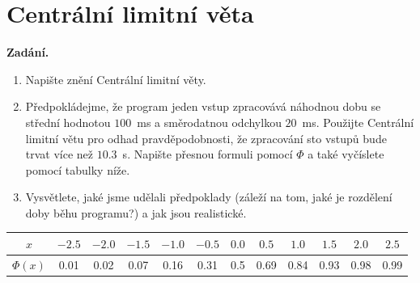 \section{Centrální limitní věta}

\noindent\textbf{Zadání.}\par
\begin{enumerate}
  \item Napište znění Centrální limitní věty.
  \item Předpokládejme, že program jeden vstup zpracovává náhodnou dobu se střední hodnotou
    $100$~ms a směrodatnou odchylkou $20$~ms. Použijte Centrální limitní větu pro odhad
    pravděpodobnosti, že zpracování sto vstupů bude trvat více než $10.3$~s. Napište přesnou
    formuli pomocí $\Phi$ a také vyčíslete pomocí tabulky níže.
  \item Vysvětlete, jaké jsme udělali předpoklady (záleží na tom, jaké je rozdělení doby běhu
    programu?) a jak jsou realistické.
\end{enumerate}

\begin{center}
\begin{tabular}{c|ccccccccccc}
\toprule
$x$ & $-2.5$ & $-2.0$ & $-1.5$ & $-1.0$ & $-0.5$ & $0.0$ & $0.5$ & $1.0$ & $1.5$ & $2.0$ & $2.5$ \\
\midrule
$\Phi(x)$ & 0.01 & 0.02 & 0.07 & 0.16 & 0.31 & 0.5 & 0.69 & 0.84 & 0.93 & 0.98 & 0.99 \\
\bottomrule
\end{tabular}
\end{center}

